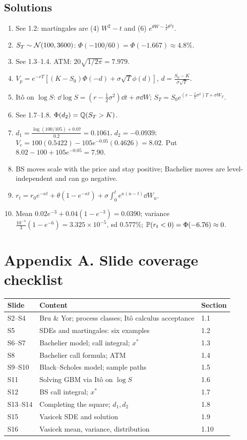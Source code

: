 \documentclass[10pt]{article}
\begin{document}
\subsection*{Solutions}
\begin{enumerate}[label=S\arabic*.]
\item See 1.2: martingales are (4) $W^2-t$ and (6) $e^{\theta W-\frac12\theta^2t}$.
\item $S_T\sim\mathcal{N}(100,3600)$: $\Phi(-100/60)=\Phi(-1.667)\approx4.8\%$.
\item See 1.3--1.4. ATM: $20\sqrt{1/2\pi}=7.979$.
\item $V_p=e^{-rT}[(K-S_0)\Phi(-d)+\sigma\sqrt T\phi(d)]$, $d=\frac{S_0-K}{\sigma\sqrt T}$.
\item It\^o on $\log S$: $\dd\log S=(r-\frac12\sigma^2)\dd t+\sigma\dd W$; $S_T=S_0e^{(r-\frac12\sigma^2)T+\sigma W_T}$.
\item See 1.7--1.8. $\Phi(d_2)=\mathbb{Q}(S_T>K)$.
\item $d_1=\frac{\log(100/105)+0.07}{0.2}=0.1061$, $d_2=-0.0939$; $V_c=100(0.5422)-105e^{-0.05}(0.4626)=8.02$. Put $8.02-100+105e^{-0.05}=7.90$.
\item BS moves scale with the price and stay positive; Bachelier moves are level-independent and can go negative.
\item $r_t=r_0e^{-\kappa t}+\theta(1-e^{-\kappa t})+\sigma\int_0^te^{\kappa(u-t)}\dd W_u$.
\item Mean $0.02e^{-3}+0.04(1-e^{-3})=0.0390$; variance $\frac{10^{-4}}{3}(1-e^{-6})=3.325\times10^{-5}$, sd $0.577\%$; $\mathbb{P}(r_t<0)=\Phi(-6.76)\approx0$.
\end{enumerate}

\section*{Appendix A. Slide coverage checklist}
{\small\begin{tabularx}{\linewidth}{@{}l X l@{}}\toprule
Slide & Content & Section\\\midrule
S2--S4 & Bru \& Yor; process classes; It\^o calculus acceptance & 1.1\\
S5 & SDEs and martingales: six examples & 1.2\\
S6--S7 & Bachelier model; call integral; $x^*$ & 1.3\\
S8 & Bachelier call formula; ATM & 1.4\\
S9--S10 & Black--Scholes model; sample paths & 1.5\\
S11 & Solving GBM via It\^o on $\log S$ & 1.6\\
S12 & BS call integral; $x^*$ & 1.7\\
S13--S14 & Completing the square; $d_1,d_2$ & 1.8\\
S15 & Vasicek SDE and solution & 1.9\\
S16 & Vasicek mean, variance, distribution & 1.10\\\bottomrule
\end{tabularx}}
\end{document}
